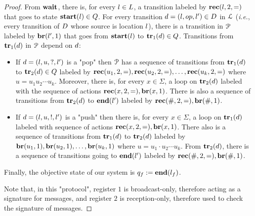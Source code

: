 \begin{proof}
	From $\mathbf{wait}$, there is, for every $l \in L$, a transition labeled by $\rec{\mathsf{\lstate}}{2}{\eqtestact}$ that goes to state $\mathbf{start}(l) \in Q$. 
	For every transition $\ltrans = (\lstate, \op, \lstate') \in \ltransitions$ in $\mathcal{L}$ (\emph{i.e.}, every transition of $D$ whose source is location $l$), there is a transition in $\mathcal{P}$ labeled by $\br{\mathsf{\lstate'}}{1}$ that goes from $\mathbf{start}(l)$ to $\mathbf{tr}_1(d) \in Q$. 
	Transitions from $\mathbf{tr}_1(d)$ in $\mathcal{P}$ depend on $d$:
	\begin{itemize}
		\item If $d=(l, u,?, l')$ is a "pop" then $\mathcal{P}$ has a sequence of transitions from $\mathbf{tr}_1(d)$ to $\mathbf{tr}_2(d) \in Q$ labeled by $\rec{\mathsf{u_1}}{2}{\eqtestact}, \rec{\mathsf{u_2}}{2}{\eqtestact}, \dots, \rec{\mathsf{u_k}}{2}{\eqtestact}$ where $u = u_1 u_2 \cdots u_k$. Moreover, there is, for every $x \in \Sigma$, a loop on $\mathbf{tr}_2(d)$ labeled with the sequence of actions $\rec{\mathsf{x}}{2}{\eqtestact}, \br{\mathsf{x}}{1}$. There is also a sequence of  transitions from $\mathbf{tr}_2(d)$ to $\mathbf{end}(l')$ labeled by $\rec{\mathsf{\#}}{2}{\eqtestact}, \br{\mathsf{\#}}{1}$.
		\item If $d= (l, u,!, l')$ is a "push" then there is, for every $x \in \Sigma$, a loop on $\mathbf{tr}_1(d)$ labeled with sequence of actions $\rec{\mathsf{x}}{2}{\eqtestact}, \br{\mathsf{x}}{1}$. There also is a sequence of transitions from $\mathbf{tr}_1(d)$ to $\mathbf{tr}_2(d)$ labeled by $\br{\mathsf{u_1}}{1}, \br{\mathsf{u_2}}{1}, \dots, \br{\mathsf{u_k}}{1}$ where $u = u_1 \cdot u_2 \cdots u_k$. From $\mathbf{tr}_2(d)$, there is  a sequence of transitions going to $\mathbf{end}(l')$ labeled by $\rec{\mathsf{\#}}{2}{\eqtestact}, \br{\mathsf{\#}}{1}$.
	\end{itemize}
	Finally, the objective state of our system is $q_f := \mathbf{end}(l_f)$.
	
	Note that, in this "protocol", register $1$ is broadcast-only, therefore acting as a signature for messages, and register $2$ is reception-only, therefore used to check the signature of messages.
	

\end{proof}
